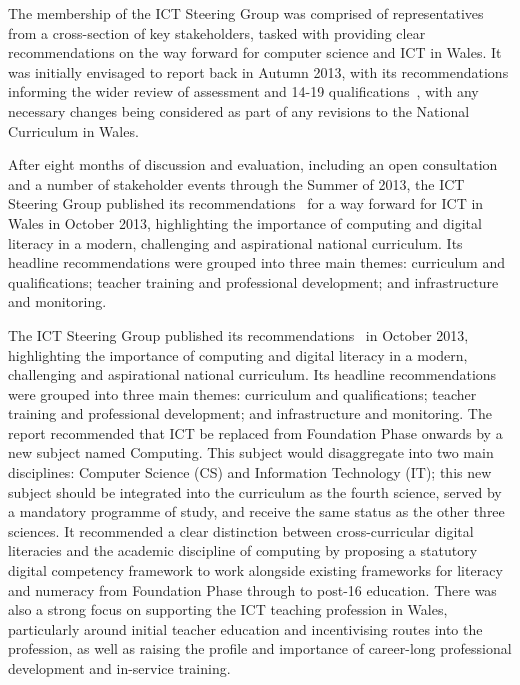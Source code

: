 
The membership of the ICT Steering Group was comprised of
representatives from a cross-section of key stakeholders, tasked with
providing clear recommendations on the way forward for computer
science and ICT in Wales. It was initially envisaged to report back in
Autumn 2013, with its recommendations informing the wider review of
assessment and 14-19 qualifications~\cite{wgrev14-19:2014}, with any
necessary changes being considered as part of any revisions to the
National Curriculum in Wales.

After eight months of discussion and evaluation, including an open
consultation and a number of stakeholder events through the Summer of
2013, the ICT Steering Group published its
recommendations~\cite{welshictreview:2013} for a way forward for ICT
in Wales in October 2013, highlighting the importance of computing and
digital literacy in a modern, challenging and aspirational national
curriculum. Its headline recommendations were grouped into three main
themes: curriculum and qualifications; teacher training and
professional development; and infrastructure and monitoring.

The ICT Steering Group published its
recommendations~\cite{welshictreview:2013} in October 2013,
highlighting the importance of computing and digital literacy in a
modern, challenging and aspirational national curriculum. Its headline
recommendations were grouped into three main themes: curriculum and
qualifications; teacher training and professional development; and
infrastructure and monitoring. The report recommended that ICT be
replaced from Foundation Phase onwards by a new subject named
Computing.  This subject would disaggregate into two main disciplines:
Computer Science (CS) and Information Technology (IT); this new
subject should be integrated into the curriculum as the fourth
science, served by a mandatory programme of study, and receive the
same status as the other three sciences. It recommended a clear
distinction between cross-curricular digital literacies and the
academic discipline of computing by proposing a statutory digital
competency framework to work alongside existing frameworks for
literacy and numeracy from Foundation Phase through to post-16
education. There was also a strong focus on supporting the ICT teaching
profession in Wales, particularly around initial teacher education and
incentivising routes into the profession, as well as raising the
profile and importance of career-long professional development and
in-service training.

